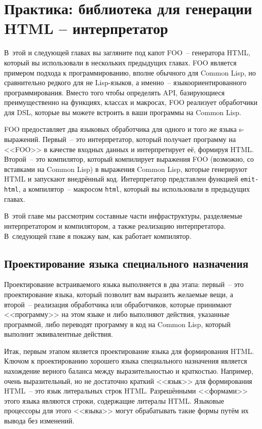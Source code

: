 \chapter{Практика: библиотека для генерации HTML -- интерпретатор}
\label{ch:30}

\thispagestyle{empty}

В~этой и следующей главах вы загляните под капот FOO~-- генератора HTML, который вы
использовали в нескольких предыдущих главах. FOO является примером подхода к
программированию, вполне обычного для Common Lisp, но сравнительно редкого для не
Lisp-языков, а именно~-- языкоориентированного программирования. Вместо того чтобы
определять API, базирующиеся преимущественно на функциях, классах и макросах, FOO
реализует обработчики для DSL, которые вы можете встроить в ваши программы на Common Lisp.

FOO предоставляет два языковых обработчика для одного и того же языка
s-выражений. Первый~-- это интерпретатор, который получает программу на <<FOO>> в качестве
входных данных и интерпретирует её, формируя HTML. Второй~-- это компилятор, который
компилирует выражения FOO (возможно, со вставками на Common Lisp) в выражения Common Lisp,
которые генерируют HTML и запускают внедрённый код. Интерпретатор представлен функцией
\lstinline{emit-html}, а компилятор~-- макросом \lstinline{html}, который вы использовали в
предыдущих главах.

В~этой главе мы рассмотрим составные части инфраструктуры, разделяемые интерпретатором и
компилятором, а также реализацию интерпретатора. В~следующей главе я покажу вам, как
работает компилятор.

\section{Проектирование языка специального назначения}

Проектирование встраиваемого языка выполняется в два этапа: первый~-- это проектирование
языка, который позволит вам выразить желаемые вещи, а второй~-- реа\-ли\-за\-ция обработчика
или обработчиков, которые принимают <<программу>> на этом языке и либо выполняют действия,
указанные программой, либо переводят программу в код на Common Lisp, который выполнит
эквивалентные действия.

Итак, первым этапом является проектирование языка для формирования HTML. Ключом к
проектированию хорошего языка специального назначения является нахождение верного баланса
между выразительностью и краткостью. Например, очень выразительный, но не достаточно
краткий <<язык>> для формирования HTML~-- это язык литеральных строк HTML. Разрешёнными
<<формами>> этого языка являются строки, содержащие литералы HTML.  Языковые процессоры
для этого <<языка>> могут обрабатывать такие формы путём их вывода без изменений.

